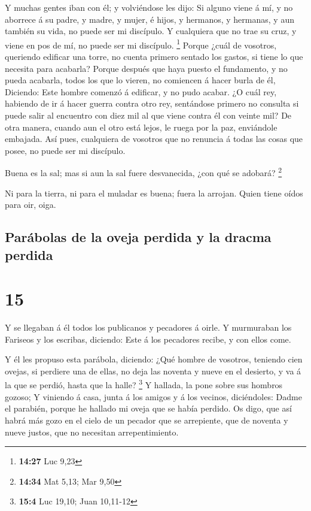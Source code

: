  Y muchas gentes iban con él; y volviéndose les dijo:
 Si alguno viene á mí, y no aborrece á su padre, y madre, y
mujer, é hijos, y hermanos, y hermanas, y aun también su vida, no puede
ser mi discípulo.  Y cualquiera que no trae su cruz, y
viene en pos de mí, no puede ser mi discípulo. \footnote{\textbf{14:27}
  Luc 9,23}  Porque ¿cuál de vosotros, queriendo edificar
una torre, no cuenta primero sentado los gastos, si tiene lo que
necesita para acabarla?  Porque después que haya puesto el
fundamento, y no pueda acabarla, todos los que lo vieren, no comiencen á
hacer burla de él,  Diciendo: Este hombre comenzó á
edificar, y no pudo acabar.  ¿O cuál rey, habiendo de ir á
hacer guerra contra otro rey, sentándose primero no consulta si puede
salir al encuentro con diez mil al que viene contra él con veinte mil?
 De otra manera, cuando aun el otro está lejos, le ruega
por la paz, enviándole embajada.  Así pues, cualquiera de
vosotros que no renuncia á todas las cosas que posee, no puede ser mi
discípulo.

 Buena es la sal; mas si aun la sal fuere desvanecida, ¿con
qué se adobará? \footnote{\textbf{14:34} Mat 5,13; Mar 9,50}

 Ni para la tierra, ni para el muladar es buena; fuera la
arrojan. Quien tiene oídos para oir, oiga.

\hypertarget{paruxe1bolas-de-la-oveja-perdida-y-la-dracma-perdida}{%
\subsection{Parábolas de la oveja perdida y la dracma
perdida}\label{paruxe1bolas-de-la-oveja-perdida-y-la-dracma-perdida}}

\hypertarget{section-14}{%
\section{15}\label{section-14}}

 Y se llegaban á él todos los publicanos y pecadores á
oirle.  Y murmuraban los Fariseos y los escribas, diciendo:
Este á los pecadores recibe, y con ellos come.

 Y él les propuso esta parábola, diciendo:  ¿Qué
hombre de vosotros, teniendo cien ovejas, si perdiere una de ellas, no
deja las noventa y nueve en el desierto, y va á la que se perdió, hasta
que la halle? \footnote{\textbf{15:4} Luc 19,10; Juan 10,11-12}
 Y hallada, la pone sobre sus hombros gozoso;  Y
viniendo á casa, junta á los amigos y á los vecinos, diciéndoles: Dadme
el parabién, porque he hallado mi oveja que se había perdido.
 Os digo, que así habrá más gozo en el cielo de un pecador
que se arrepiente, que de noventa y nueve justos, que no necesitan
arrepentimiento.

